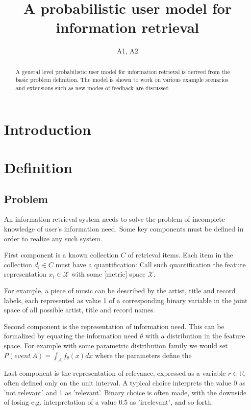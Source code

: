 \documentclass[10pt]{tufte-handout}
\title{A probabilistic user model for information retrieval}
\author{A1, A2}
\date{}
\begin{document}
\maketitle
\begin{abstract}
 A general level probabilistic user model for information retrieval is derived from the basic problem definition. The model is shown to work on various example scenarios and extensions such as new modes of feedback are discussed.
\end{abstract}

\section{Introduction}

\section{Definition}
\subsection{Problem}
An information retrieval system needs to solve the problem of incomplete knowledge of user's information need. Some key components must be defined in order to realize any such system.

First component is a known collection $C$ of retrieval items. Each item in the collection $d_i \in C$ must have a quantification: Call such quantification the feature representation $x_i\in \mathcal X$ with some [metric] space $\mathcal X$. 

For example, a piece of music can be described by the artist, title and record labels, each represented as value 1 of a corresponding binary variable in the joint space of all possible artist, title and record names. 

Second component is the representation of information need. This can be formalized by equating the information need $\theta$ with a distribution in the feature space. For example with some parametric distribution family we would set $P(event\ A) = \int_A f_\theta (x) dx$ where the parameters define the 

Last component is the representation of relevance, expressed as a variable $r\in \mathbb R$, often defined only on the unit interval. A typical choice interprets the value 0 as 'not relevant' and 1 as 'relevant'. Binary choice is often made, with the downside of losing e.g. interpretation of a value 0.5 as 'irrelevant', and so forth.
\end{document}
